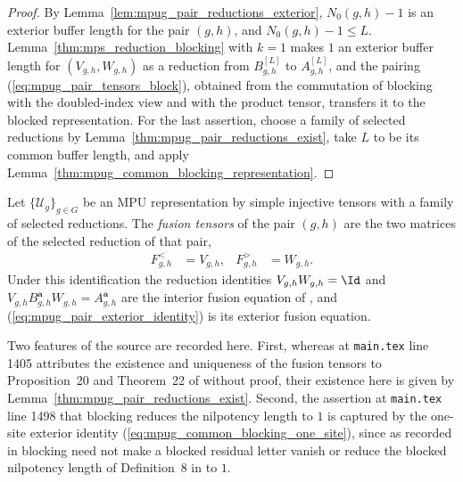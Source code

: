 \begin{proof}
    \leanok
    By Lemma~\ref{lem:mpug_pair_reductions_exterior}, $N_0(g,h)-1$ is an
    exterior buffer length for the pair $(g,h)$, and $N_0(g,h)-1\leq L$.
    Lemma~\ref{thm:mps_reduction_blocking} with $k=1$ makes $1$ an
    exterior buffer length for $(V_{g,h},W_{g,h})$ as a reduction from
    $B_{g,h}^{[L]}$ to $A_{g,h}^{[L]}$, and the pairing
    (\ref{eq:mpug_pair_tensors_block}), obtained from the commutation of
    blocking with the doubled-index view and with the product tensor,
    transfers it to the blocked representation.  For the last assertion,
    choose a family of selected reductions by
    Lemma~\ref{thm:mpug_pair_reductions_exist}, take $L$ to be its common
    buffer length, and apply
    Lemma~\ref{thm:mpug_common_blocking_representation}.
\end{proof}

\begin{definition}
    \label{def:mpug_fusion_tensors}
    \leanok
    Let $\{\mathcal U_g\}_{g\in G}$ be an MPU representation by simple
    injective tensors with a family of selected reductions.  The \emph{fusion
        tensors} of the pair $(g,h)$ are the two matrices of the selected
    reduction of that pair,
    \begin{align}
        F^<_{g,h} & =V_{g,h}, & F^>_{g,h} & =W_{g,h}.
        \label{eq:mpug_fusion_tensors}
    \end{align}
    Under this identification the reduction identities
    $V_{g,h}W_{g,h}=\Id$ and
    $V_{g,h}B_{g,h}^{\mathbf a}W_{g,h}=A_{g,h}^{\mathbf a}$ are the interior
    fusion equation of \cite[lines 1459--1497]{FrancoRubio2025MPUGauging}, and
    (\ref{eq:mpug_pair_exterior_identity}) is its exterior fusion equation.

    Two features of the source are recorded here.  First, whereas
    \cite{FrancoRubio2025MPUGauging} at \texttt{main.tex} line 1405 attributes
    the existence and uniqueness of the fusion tensors to Proposition~20 and
    Theorem~22 of \cite{Molnar2018SemiInjective} without proof, their existence
    here is given by Lemma~\ref{thm:mpug_pair_reductions_exist}.  Second, the
    assertion at \texttt{main.tex} line 1498 that blocking reduces the
    nilpotency length to $1$ is captured by the one-site exterior identity
    (\ref{eq:mpug_common_blocking_one_site}), since as recorded in
    \cite{gap:mgsc18_nilpotency_length_one_terminology} blocking need not make
    a blocked residual letter vanish or reduce the blocked nilpotency length of
    Definition~8 in \cite{Molnar2018SemiInjective} to $1$.
\end{definition}

